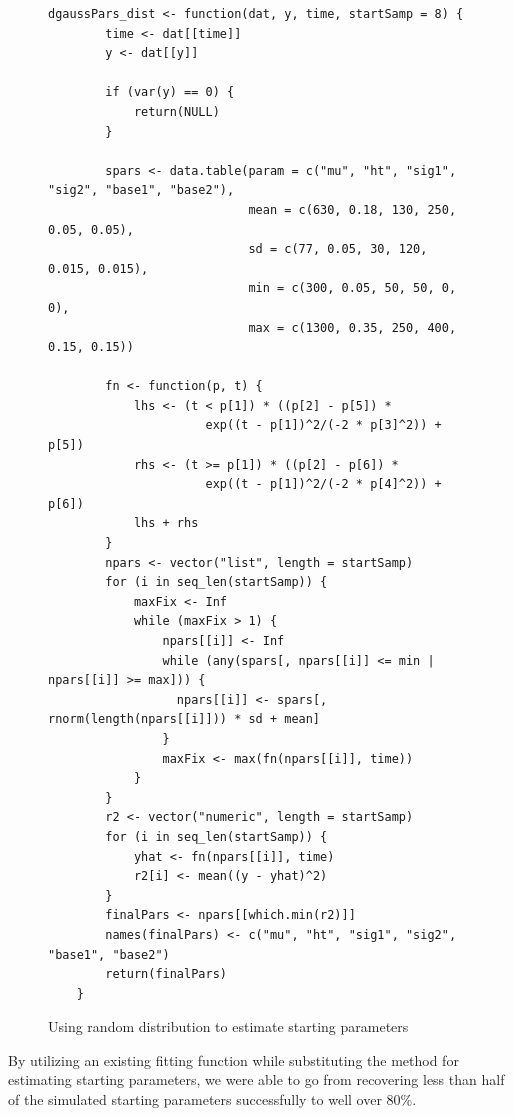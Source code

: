\documentclass{article}
\begin{document}
\begin{singlespace}
\begin{figure}[H]
\centering
\begin{BVerbatim}
dgaussPars_dist <- function(dat, y, time, startSamp = 8) {
        time <- dat[[time]]
        y <- dat[[y]]
        
        if (var(y) == 0) {
            return(NULL)
        }
        
        spars <- data.table(param = c("mu", "ht", "sig1", "sig2", "base1", "base2"),
                            mean = c(630, 0.18, 130, 250, 0.05, 0.05), 
                            sd = c(77, 0.05, 30, 120, 0.015, 0.015), 
                            min = c(300, 0.05, 50, 50, 0, 0), 
                            max = c(1300, 0.35, 250, 400, 0.15, 0.15))
        
        fn <- function(p, t) {
            lhs <- (t < p[1]) * ((p[2] - p[5]) * 
                      exp((t - p[1])^2/(-2 * p[3]^2)) + p[5])
            rhs <- (t >= p[1]) * ((p[2] - p[6]) * 
                      exp((t - p[1])^2/(-2 * p[4]^2)) + p[6])
            lhs + rhs
        }
        npars <- vector("list", length = startSamp)
        for (i in seq_len(startSamp)) {
            maxFix <- Inf
            while (maxFix > 1) {
                npars[[i]] <- Inf
                while (any(spars[, npars[[i]] <= min | npars[[i]] >= max])) {
                  npars[[i]] <- spars[, rnorm(length(npars[[i]])) * sd + mean]
                }
                maxFix <- max(fn(npars[[i]], time))
            }
        }
        r2 <- vector("numeric", length = startSamp)
        for (i in seq_len(startSamp)) {
            yhat <- fn(npars[[i]], time)
            r2[i] <- mean((y - yhat)^2)
        }
        finalPars <- npars[[which.min(r2)]]
        names(finalPars) <- c("mu", "ht", "sig1", "sig2", "base1", "base2")
        return(finalPars)
    }
\end{BVerbatim}
\caption{Using random distribution to estimate starting parameters}
\label{fig:gauss_form_dist}
\end{figure}
\end{singlespace}

By utilizing an existing fitting function while substituting the method for estimating starting parameters, we were able to go from recovering less than half of the simulated starting parameters successfully to well over 80\%.
\end{document}

